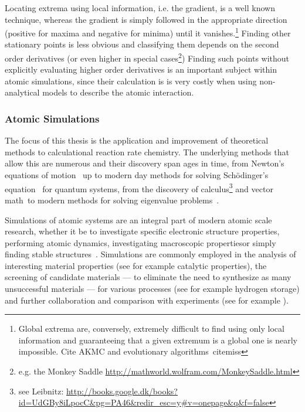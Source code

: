 Locating extrema using local information, i.e. the gradient, is a well known technique\citemiss, whereas the gradient is simply followed in the appropriate direction (positive for maxima and negative for minima) until it vanishes.\footnote{Global extrema are, conversely, extremely difficult to find using only local information and guaranteeing that a given extremum is a global one is nearly impossible. Cite AKMC and evolutionary algorithms~citemiss}
Finding other stationary points is less obvious and classifying them depends on the second order derivatives (or even higher in special cases\footnote{e.g. the Monkey Saddle \url{http://mathworld.wolfram.com/MonkeySaddle.html}})
Finding such points without explicitly evaluating higher order derivatives is an important subject within atomic simulations, since their calculation is is very costly when using non-analytical  models to describe the atomic interaction.

\subsubsection{Atomic Simulations}
The focus of this thesis is the application and improvement of theoretical methods to calculational reaction rate chemistry.
The underlying methods that allow this are numerous and their discovery span ages in time, from Newton's equations of motion~\cite{newton-latin} up to modern day methods for solving Sch\"odinger's equation~\cite{schrodinger-equation-1926} for quantum systems\cite{hohenberg-kohn-1964, gpaw-review-2010, dacapo-1999}, from the discovery of calculus\citemiss\footnote{see Leibnitz: \url{http://books.google.dk/books?id=UdGBy8iLpocC&pg=PA46&redir_esc=y\#v=onepage&q&f=false}} and vector math~\citemiss to modern methods for solving eigenvalue problems~\cite{eigenvalue-problems-2000}.

Simulations of atomic systems are an integral part of modern atomic scale research, whether it be to investigate specific electronic structure properties\citemiss, performing atomic dynamics\citemiss, investigating macroscopic properties\citemiss or simply finding stable structures~\citemiss.
Simulations are commonly employed in the analysis of interesting material properties (see for example catalytic properties\citemiss), the screening of candidate materials --- to eliminate the need to synthesize as many unsuccessful materials --- for various processes (see for example hydrogen storage\citemiss) and further collaboration and comparison with experiments (see for example \citemiss).

